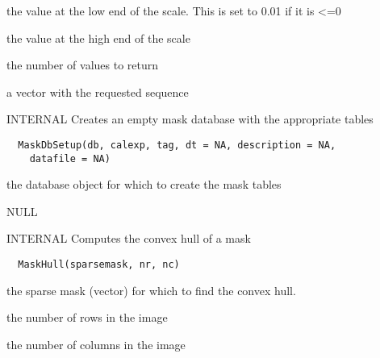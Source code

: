 \documentclass[a4paper]{book}
\begin{document}
%
\begin{Arguments}
\begin{ldescription}
\item[\code{minv}] the value at the low end of the scale.  This
is set to 0.01 if it is <=0

\item[\code{maxv}] the value at the high end of the scale

\item[\code{length.out}] the number of values to return
\end{ldescription}
\end{Arguments}
%
\begin{Value}
a vector with the requested sequence
\end{Value}
%
\begin{Description}\relax
INTERNAL Creates an empty mask database with the
appropriate tables
\end{Description}
%
\begin{Usage}
\begin{verbatim}
  MaskDbSetup(db, calexp, tag, dt = NA, description = NA,
    datafile = NA)
\end{verbatim}
\end{Usage}
%
\begin{Arguments}
\begin{ldescription}
\item[\code{db}] the database object for which to create the
mask tables
\end{ldescription}
\end{Arguments}
%
\begin{Value}
NULL
\end{Value}
%
\begin{Description}\relax
INTERNAL Computes the convex hull of a mask
\end{Description}
%
\begin{Usage}
\begin{verbatim}
  MaskHull(sparsemask, nr, nc)
\end{verbatim}
\end{Usage}
%
\begin{Arguments}
\begin{ldescription}
\item[\code{sparsemask}] the sparse mask (vector) for which to
find the convex hull.

\item[\code{nr}] the number of rows in the image

\item[\code{nc}] the number of columns in the image
\end{ldescription}
\end{Arguments}
\end{document}
